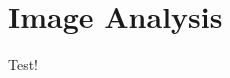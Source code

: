 \documentclass[report.tex]{subfiles}
\begin{document}
\section{Image Analysis}
Test!
\end{document}
